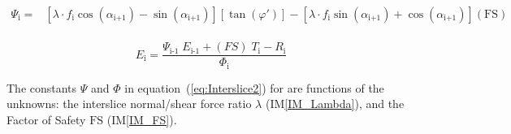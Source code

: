 \documentclass[12pt]{article}
\newcommand{\iref}[1]{IM\ref{#1}}
\begin{document}
~\newline 
\begin{equation}\label{eq:Psi}\begin{aligned}
\Psi_{\text{i}} ={}& \left[ \lambda \cdot f_{\text{i}}
  \cos\left(\alpha_{\text{i+1}}\right) -
  \sin\left(\alpha_{\text{i+1}}\right) \right]\left[
  \tan\left(\varphi'\right) \right] - \left[ \lambda \cdot
  f_{\text{i}} \sin\left(\alpha_{\text{i+1}}\right) +
  \cos\left(\alpha_{\text{i+1}}\right) \right] \left( \text{FS}
\right)
 \end{aligned}\end{equation}
~\newline
\begin{equation}\label{eq:Interslice2}
{E}_{\text{i}} = \frac{{\Psi_{\text{i-1}}}\;{{E}_{\text{i-1}}} +
  \left({{FS}}\right)\;{T_{\text{i}}} -
       {R_{\text{i}}}}{\Phi_{\text{i}}}
\end{equation}

\noindent
The constants $\Psi$ and $\Phi$ in equation~(\ref{eq:Interslice2}) for
are functions of the unknowns: the interslice normal/shear force ratio $\lambda{}$  (\iref{IM_Lambda}), and the Factor
of Safety $\text{FS}$ (\iref{IM_FS}).

~\newline

\end{document}
